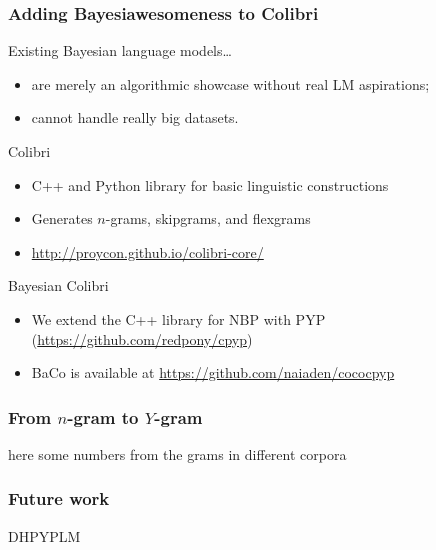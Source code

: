 \documentclass{beamer}
\begin{document}
\begin{frame}
    \frametitle{Adding Bayesiawesomeness to Colibri}
    
    Existing Bayesian language models\ldots
        \begin{itemize}
            \item are merely an algorithmic showcase without real LM aspirations;
            \item cannot handle really big datasets.
        \end{itemize}

    \begin{block}{Colibri}
        \begin{itemize}
            \item C++ and Python library for basic linguistic constructions
            \item Generates $n$-grams, skipgrams, and flexgrams
            \item \url{http://proycon.github.io/colibri-core/}
        \end{itemize}
    \end{block}
    \vspace{-0.25cm}
    \begin{block}{Bayesian Colibri}
        \begin{itemize}
            \item We extend the C++ library for NBP with PYP (\url{https://github.com/redpony/cpyp})
            \item BaCo is available at \url{https://github.com/naiaden/cococpyp}
        \end{itemize}
    \end{block}
\end{frame}

\begin{frame}
    \frametitle{From $n$-gram to $Y$-gram}

    here some numbers from the grams in different corpora

\end{frame}

\begin{frame}
    \frametitle{Future work}

    DHPYPLM
\end{frame}
\end{document}
